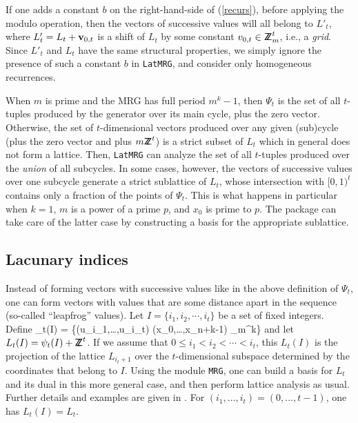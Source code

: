 If one adds a constant $b$ on the right-hand-side of (\ref{recurs}),
before applying the modulo operation, then the vectors of successive values
will all belong to $L'_t$, where $L'_t = L_t + {\bf v}_{0,t}$ is a shift of $L_t$
by some constant $v_{0,t}\in{\sf Z\kern-0.4em Z}_m^t$, i.e., a {\em grid\/}.
Since $L'_t$ and $L_t$ have the same structural properties, we simply
ignore the presence of such a constant $b$ in {\tt LatMRG}, and 
consider only homogeneous recurrences.

When $m$ is prime and the MRG has full period $m^k-1$, then $\Psi_t$ is the
set of all $t$-tuples produced by the generator over its main cycle,
plus the zero vector.
Otherwise, the set of
$t$-dimensional vectors produced over any given (sub)cycle (plus the
zero vector and plus $m{\sf Z\kern-0.4em Z}^t$) is a strict subset of $L_t$ which in
general does not form a lattice.
Then, {\tt LatMRG} can analyze the set of all $t$-tuples produced over
the {\em union\/} of all subcycles.
In some cases, however, the vectors of
successive values over one subcycle generate a strict sublattice
of $L_t$, whose intersection with $[0,1)^t$ contains only a fraction of
the points of $\Psi_t$.
This is what happens in particular when $k=1$, $m$ is a power of a
prime $p$, and $x_0$ is prime to $p$.
The package can take care of the latter case by constructing a
basis for the appropriate sublattice.

\subsection {Lacunary indices}

Instead of forming vectors with successive values like in the above
definition of $\Psi_t$,
one can form vectors with values that are some distance apart in the
sequence (so-called ``leapfrog'' values).
Let $I=\{i_1 , i_2 , \cdots , i_t\}$ be a set of fixed integers.
Define
\eq
 \psi_t(I) = \{(u_{i_1},\dots,u_{i_t}) \mid
             (x_0,\dots,x_{n+k-1}) \in \Z_m^k\}                  
\endeq
and let $L_t(I) = \psi_t(I) + {\sf Z\kern-0.4em Z}^t$.
If we assume that $0\le i_1 < i_2 < \cdots < i_t$, 
this $L_t(I)$ is the projection of the lattice $L_{i_t+1}$ over the $t$-dimensional
subspace determined by the coordinates that belong to $I$.
Using the module {\tt MRG}, one can build a basis for $L_t$ and its
dual in this more general case, and then perform lattice analysis as usual.
Further details and examples are given in \cite{rLEC97c}.
For $(i_1,\dots,i_t) = (0,\dots,t-1)$, one has $L_t(I) = L_t$.


